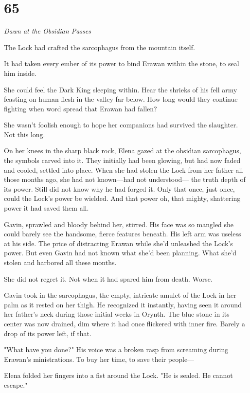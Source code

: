 
\chapter{65}

\emph{Dawn at the Obsidian Passes}

The Lock had crafted the sarcophagus from the mountain itself.

It had taken every ember of its power to bind Erawan within the stone, to seal him inside.

She could feel the Dark King sleeping within. Hear the shrieks of his fell army feasting on human flesh in the valley far below. How long would they continue fighting when word spread that Erawan had fallen?

She wasn't foolish enough to hope her companions had survived the slaughter. Not this long.

On her knees in the sharp black rock, Elena gazed at the obsidian sarcophagus, the symbols carved into it. They initially had been glowing, but had now faded and cooled, settled into place. When she had stolen the Lock from her father all those months ago, she had not known---had not understood--- the truth depth of its power. Still did not know why he had forged it. Only that once, just once, could the Lock's power be wielded. And that power  oh, that mighty, shattering power  it had saved them all.

Gavin, sprawled and bloody behind her, stirred. His face was so mangled she could barely see the handsome, fierce features beneath. His left arm was useless at his side. The price of distracting Erawan while she'd unleashed the Lock's power. But even Gavin had not known what she'd been planning. What she'd stolen and harbored all these months.

She did not regret it. Not when it had spared him from death. Worse.

Gavin took in the sarcophagus, the empty, intricate amulet of the Lock in her palm as it rested on her thigh. He recognized it instantly, having seen it around her father's neck during those initial weeks in Orynth. The blue stone in its center was now drained, dim where it had once flickered with inner fire. Barely a drop of its power left, if that.

"What have you done?" His voice was a broken rasp from screaming during Erawan's ministrations. To buy her time, to save their people---

Elena folded her fingers into a fist around the Lock. "He is sealed. He cannot escape."

